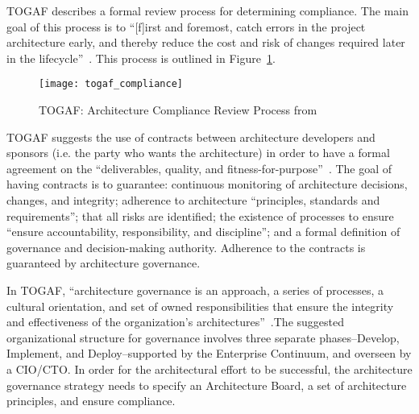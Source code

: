 TOGAF describes a formal review process for determining compliance. The main goal of this process is to ``[f]irst and foremost, catch errors in the project architecture early, and thereby reduce the cost and risk of changes required later in the lifecycle''~\cite[Ch. 48.3.1]{togaf9.1}. This process is outlined in Figure~\ref{fig:togaf_compliance}.

\begin{figure}
\texttt{[image: togaf\_compliance]}
\caption{TOGAF: Architecture Compliance Review Process from \cite[Sec. 48.4.1]{togaf9.1}}
\label{fig:togaf_compliance}
\end{figure}



TOGAF suggests the use of contracts between architecture developers and sponsors (i.e. the party who wants the architecture) in order to have a formal agreement on the ``deliverables, quality, and fitness-for-purpose''~\cite[Ch. 49]{togaf9.1}. The goal of having contracts is to guarantee: continuous monitoring of architecture decisions, changes, and integrity; adherence to architecture ``principles, standards and requirements''; that all risks are identified;  the existence of processes to ensure ``ensure accountability, responsibility, and discipline''; and a formal definition of governance and decision-making authority. Adherence to the contracts is guaranteed by architecture governance.

In TOGAF, ``architecture governance is an approach, a series of processes, a cultural orientation, and set of owned responsibilities that ensure the integrity and effectiveness of the organization's architectures''~\cite[Ch. 50]{togaf9.1}.The suggested organizational structure for governance involves three separate phases--Develop, Implement, and Deploy--supported by the Enterprise Continuum, and overseen by a CIO/CTO. In order for the architectural effort to be successful, the architecture governance strategy needs to specify an Architecture Board, a set of architecture principles, and ensure compliance.  %

